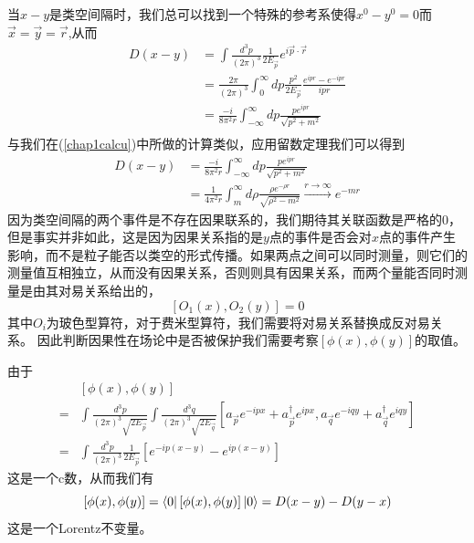 当$x-y$是类空间隔时，我们总可以找到一个特殊的参考系使得$x^{0}-y^{0}=0$而$\vec{x}=\vec{y}=\vec{r}$,从而
\begin{equation}
\label{chap333}
    \begin{aligned}
        D(x-y)&=\int \frac{d^{3}p}{(2\pi)^{3}}\frac{1}{2E_{\vec{p}}}e^{i\vec{p}\cdot\vec{r}}\\
        &=\frac{2\pi}{(2\pi)^{3}}\int_{0}^{\infty}dp\frac{p^{2}}{2E_{\vec{p}}}\frac{e^{ipr}-e^{-ipr}}{ipr}\\
        &=\frac{-i}{8\pi^{2}r}\int_{-\infty}^{\infty}dp\frac{pe^{ipr}}{\sqrt{p^{2}+m^{2}}}\\
    \end{aligned}
\end{equation}
与我们在(\ref{chap1calcu})中所做的计算类似，应用留数定理我们可以得到
\begin{equation}
\begin{aligned}
    D(x-y)&=\frac{-i}{8\pi^{2}r}\int_{-\infty}^{\infty}dp\frac{pe^{ipr}}{\sqrt{p^{2}+m^{2}}}\\
    &=\frac{1}{4\pi^{2}r}\int_{m}^{\infty}d\rho \frac{\rho e^{-\rho r}}{\sqrt{\rho^{2}-m^{2}}} \xrightarrow{r\rightarrow \infty}e^{-mr}
    \end{aligned}
\end{equation}
因为类空间隔的两个事件是不存在因果联系的，我们期待其关联函数是严格的0，但是事实并非如此，这是因为因果关系指的是$y$点的事件是否会对$x$点的事件产生影响，而不是粒子能否以类空的形式传播。如果两点之间可以同时测量，则它们的测量值互相独立，从而没有因果关系，否则则具有因果关系，而两个量能否同时测量是由其对易关系给出的，
\begin{equation}
\label{chap3commuta}
    \left[O_{1}(x),O_{2}(y)\right]=0
\end{equation}
其中$O_{i}$为玻色型算符，对于费米型算符，我们需要将对易关系替换成反对易关系。
因此判断因果性在场论中是否被保护我们需要考察$\left[\phi(x),\phi(y)\right]$的取值。

由于
\begin{equation}
\label{chap3realKG}
\begin{aligned}
    &\left[\phi(x),\phi(y)\right]\\
    =&\int\frac{d^{3}p}{(2\pi)^{3}\sqrt{2E_{\vec{p}}}}\int\frac{d^{3}q}{(2\pi)^{3}\sqrt{2E_{\vec{q}}}}\left[a_{\vec{p}}e^{-ipx}+a^{\dagger}_{\vec{p}}e^{ipx},a_{\vec{q}}e^{-iqy}+a^{\dagger}_{\vec{q}}e^{iqy}\right]\\
    =&\int\frac{d^{3}p}{(2\pi)^{3}}\frac{1}{2E_{\vec{p}}}\left[e^{-ip(x-y)}-e^{ip(x-y)}\right]
    \end{aligned}
\end{equation}
这是一个c数，从而我们有
\begin{equation}
     \left[\phi(x),\phi(y)\right]= \bra{0}\left[\phi(x),\phi(y)\right]\ket{0}=D(x-y)-D(y-x)
\end{equation}
这是一个Lorentz不变量。


